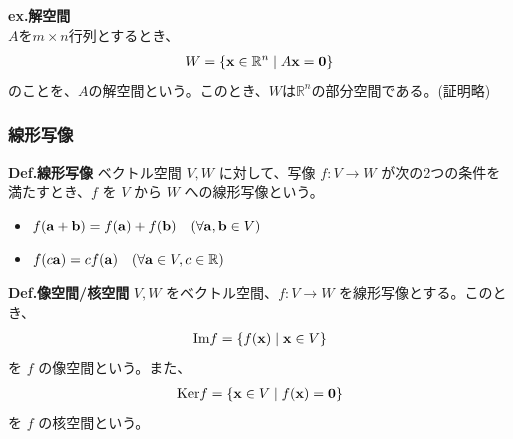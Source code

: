 \documentclass[a4paper,11pt]{jsarticle}
\numberwithin{equation}{section}
\begin{document}
\textbf{ex.解空間}\\
$A$を$m \times n $行列とするとき、
\begin{align}
  W = \left\{ \vb{x} \in \mathbb{R}^n \mid A\vb{x} = \vb{0} \right\}
\end{align}
のことを、$A$の解空間という。このとき、$W$は$\mathbb{R}^n$の部分空間である。(証明略)\\

\subsubsection{線形写像}
\begin{itembox}[l]{\textbf{Def.線形写像}}
  ベクトル空間 $V, W$ に対して、写像 $f: V \rightarrow W$ が次の2つの条件を満たすとき、$f$ を $V$ から $W$ への線形写像という。
  \begin{itemize}
    \item $f(\vb{a} + \vb{b}) = f(\vb{a}) + f(\vb{b}) \quad  (\forall \vb{a}, \vb{b} \in V)$
    \item $f(c\vb{a}) = cf(\vb{a}) \quad (\forall \vb{a} \in V, c \in \mathbb{R})$
  \end{itemize}
\end{itembox}

\begin{itembox}[l]{\textbf{Def.像空間/核空間}}
  $V, W$ をベクトル空間、$f: V \rightarrow W$ を線形写像とする。このとき、
  \begin{align}
    \text{Im}f = \left\{ f(\vb{x}) \mid \vb{x} \in V \right\}
  \end{align}
  を $f$ の像空間という。また、
  \begin{align}
    \text{Ker}f = \left\{ \vb{x} \in V \mid f(\vb{x}) = \vb{0} \right\}
  \end{align}
  を $f$ の核空間という。
\end{itembox}
\end{document}

